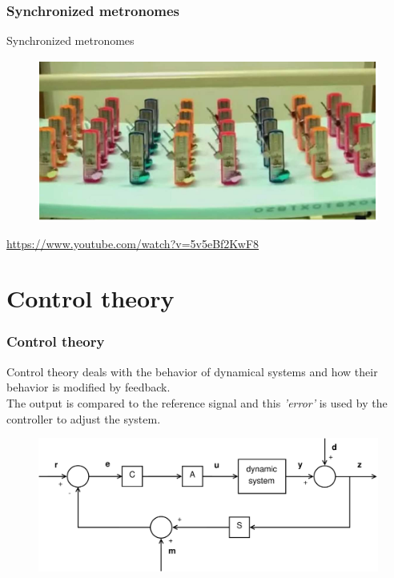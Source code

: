 \documentclass{beamer}
\begin{document}
\begin{frame}
\frametitle{Synchronized metronomes}
Synchronized metronomes
\begin{figure}
\includegraphics[scale=0.8]{synchronized_metronomes}
\end{figure}
\url{https://www.youtube.com/watch?v=5v5eBf2KwF8}
\end{frame}

\section{Control theory}

\begin{frame}
\frametitle{Control theory}
Control theory deals with the behavior of dynamical systems and how their behavior is modified by feedback.\\
The output is compared to the reference signal and this \textit{'error'} is used by the controller to adjust the system. 
\medskip
\begin{figure}
\includegraphics[width=1\linewidth]{full_system1}
\end{figure}
\end{frame}

\end{document}
